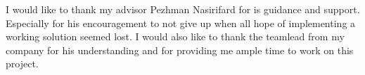 I would like to thank my advisor Pezhman Nasirifard for is guidance and support. Especially for his encouragement to not give up when all hope of implementing a working solution seemed lost. I would also like to thank the teamlead from my company for his understanding and for providing me ample time to work on this project.
